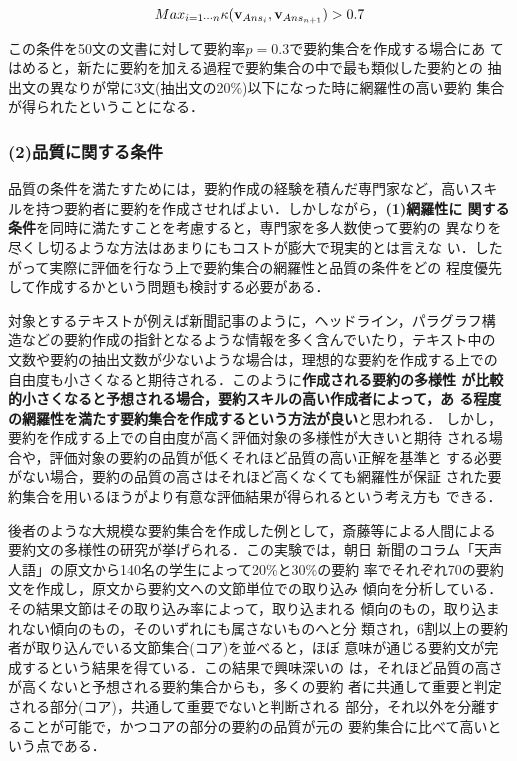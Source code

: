 \begin{equation} 
Max_{i = 1 \cdots n} \kappa({\bf v}_{Ans_i}, {\bf v}_{Ans_{n+1}}) > 0.7
\label{satulation-condition}
\end{equation}

この条件を50文の文書に対して要約率$p=0.3$で要約集合を作成する場合にあ
てはめると，新たに要約を加える過程で要約集合の中で最も類似した要約との
抽出文の異なりが常に3文(抽出文の20\%)以下になった時に網羅性の高い要約
集合が得られたということになる．



\subsubsection*{(2)品質に関する条件}

品質の条件を満たすためには，要約作成の経験を積んだ専門家など，高いスキ
ルを持つ要約者に要約を作成させればよい．しかしながら，{\bf (1)網羅性に
関する条件}を同時に満たすことを考慮すると，専門家を多人数使って要約の
異なりを尽くし切るような方法はあまりにもコストが膨大で現実的とは言えな
い．したがって実際に評価を行なう上で要約集合の網羅性と品質の条件をどの
程度優先して作成するかという問題も検討する必要がある．

対象とするテキストが例えば新聞記事のように，ヘッドライン，パラグラフ構
造などの要約作成の指針となるような情報を多く含んでいたり，テキスト中の
文数や要約の抽出文数が少ないような場合は，理想的な要約を作成する上での
自由度も小さくなると期待される．このように{\bf 作成される要約の多様性
が比較的小さくなると予想される場合，要約スキルの高い作成者によって，あ
る程度の網羅性を満たす要約集合を作成するという方法が良い}と思われる．
しかし，要約を作成する上での自由度が高く評価対象の多様性が大きいと期待
される場合や，評価対象の要約の品質が低くそれほど品質の高い正解を基準と
する必要がない場合，要約の品質の高さはそれほど高くなくても網羅性が保証
された要約集合を用いるほうがより有意な評価結果が得られるという考え方も
できる．

後者のような大規模な要約集合を作成した例として，斎藤等による人間による
要約文の多様性の研究\cite{K.Saito.01J}が挙げられる．この実験では，朝日
新聞のコラム「天声人語」の原文から140名の学生によって20\%と30\%の要約
率でそれぞれ70の要約文を作成し，原文から要約文への文節単位での取り込み
傾向を分析している．その結果文節はその取り込み率によって，取り込まれる
傾向のもの，取り込まれない傾向のもの，そのいずれにも属さないものへと分
類され，6割以上の要約者が取り込んでいる文節集合(コア)を並べると，ほぼ
意味が通じる要約文が完成するという結果を得ている．この結果で興味深いの
は，それほど品質の高さが高くないと予想される要約集合からも，多くの要約
者に共通して重要と判定される部分(コア)，共通して重要でないと判断される
部分，それ以外を分離することが可能で，かつコアの部分の要約の品質が元の
要約集合に比べて高いという点である． \\

